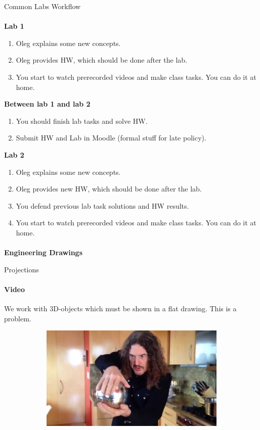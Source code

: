 \documentclass[aspectratio=169]{beamer}
\begin{document}
\begin{frame}[t]{Common Labs Workflow}
\framesubtitle{}
\vspace{-0.4cm}

    \textbf{Lab 1}
    \begin{enumerate}
        \scriptsize
        \item Oleg explains some new concepts.
        \item Oleg provides HW, which should be done after the lab.
        \item You start to watch prerecorded videos and make class tasks. You can do it at home.
    \end{enumerate}
    \textbf{Between lab 1 and lab 2}
    \begin{enumerate}
        \scriptsize
        \item You should finish lab tasks and solve HW.
        \item Submit HW and Lab in Moodle (formal stuff for late policy).
    \end{enumerate}
    \textbf{Lab 2}
    \begin{enumerate}
        \scriptsize
        \item Oleg explains some new concepts.
        \item Oleg provides new HW, which should be done after the lab.
        \item You defend previous lab task solutions and HW results.
        \item You start to watch prerecorded videos and make class tasks. You can do it at home.
    \end{enumerate}
\end{frame}

\begin{frame}[c]{}
    \framesubtitle{}
    \LARGE \centering
    \textbf{Engineering Drawings}
\end{frame}

\begin{frame}[t]{Projections}
    \framesubtitle{Video}
    \vspace{-0.3cm}
    We work with 3D-objects which must be shown in a flat drawing. This is a problem.

    \begin{figure}[H]
        \href{https://youtu.be/_SZkh6w_4EA}{
            \centering\includegraphics[height=5cm,width=1\textwidth,keepaspectratio]{resources/projection_video.jpg}}
        \label{fig:resources/projection_video.jpg}
    \end{figure}
\end{frame}
\end{document}
